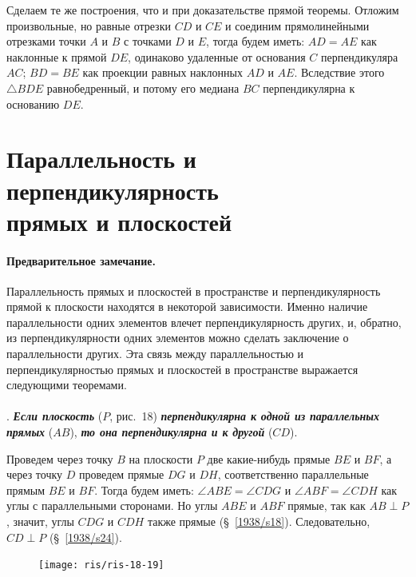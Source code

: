 \documentclass[twoside]{book}
\begin{document}
Сделаем те же построения, что и при доказательстве прямой теоремы.
Отложим произвольные, но равные отрезки $CD$ и $CE$ и соединим прямолинейными отрезками точки $A$ и $B$ с точками $D$ и $E$, тогда будем иметь: $AD=AE$ как наклонные к прямой $DE$, одинаково удаленные от основания $C$ перпендикуляра $AC$;
$BD=BE$ как проекции равных наклонных $AD$ и $AE$.
Вследствие этого $\triangle BDE$ равнобедренный, и потому его медиана $BC$ перпендикулярна к основанию $DE$.



\section[Параллельность и перпендикулярность]{Параллельность и перпендикулярность\\ прямых и плоскостей}


\paragraph{Предварительное замечание.}\label{1938/s30}
Параллельность прямых и плоскостей в пространстве и перпендикулярность прямой к плоскости находятся в некоторой зависимости.
Именно наличие параллельности одних элементов влечет перпендикулярность других, и, обратно, из перпендикулярности одних элементов можно сделать заключение о параллельности других.
Эта связь между параллельностью и перпендикулярностью прямых и плоскостей в пространстве выражается следующими теоремами.

\paragraph{}\label{1938/s31}
.
\textbf{\emph{Если плоскость}} ($P$, рис.~18) \textbf{\emph{перпендикулярна к одной из параллельных прямых}} ($AB$), \textbf{\emph{то она перпендикулярна и к другой}} ($CD$).

Проведем через точку $B$ на плоскости $P$ две какие-нибудь прямые $BE$ и $BF$, а через точку $D$ проведем прямые $DG$ и $DH$, соответственно параллельные прямым $BE$ и $BF$.
Тогда будем иметь: $\angle ABE=\angle CDG$ и $\angle ABF = \angle CDH$ как углы с параллельными сторонами.
Но углы $ABE$ и $ABF$ прямые, так как $AB\perp P$, значит, углы $CDG$ и $CDH$ также прямые (§~\ref{1938/s18}).
Следовательно, $CD \perp P$ (§~\ref{1938/s24}).

\begin{figure}[h!]
\centering
\texttt{[image: ris/ris-18-19]}
\caption{}
\end{figure}
\end{document}

